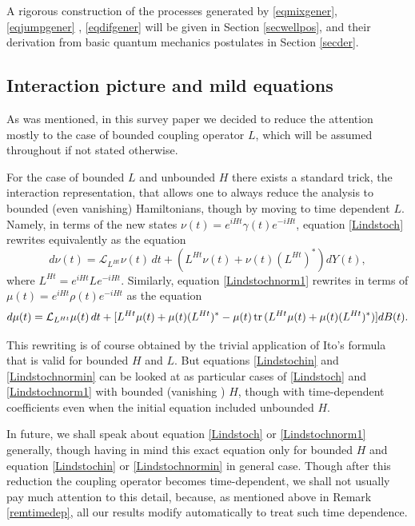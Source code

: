 \documentclass[12pt]{article}
\def\LC{\mathcal{L}}
\def\tr{\rm{tr}}
\def\ga{\gamma}
\begin{document}
A rigorous construction of the processes generated by
\eqref{eqmixgener}, \eqref{eqjumpgener} , \eqref{eqdifgener}
will be given in Section \ref{secwellpos},
 and their derivation from basic quantum mechanics postulates in Section \ref{secder}.

\subsection{Interaction picture and mild equations}
\label{secinter}

As was mentioned, in this survey paper we decided to reduce the attention mostly
 to the case of bounded coupling operator $L$,
which will be assumed throughout if not stated otherwise.

For the case of bounded $L$ and unbounded $H$ there exists a standard trick,
the interaction representation,
that allows one to always reduce the analysis to bounded (even vanishing) Hamiltonians, though by moving
to time dependent $L$.  Namely, in terms of the new states $\nu(t)=e^{iHt}\ga(t) e^{-iHt}$,
equation \eqref{Lindstoch} rewrites equivalently as the equation
\begin{equation}
\label{Lindstochin}
d\nu(t)=\LC_{L^{Ht}} \nu(t) \, dt +(L^{Ht}\nu(t)+\nu(t) (L^{Ht})^*) dY(t),
\end{equation}
where $L^{Ht}=e^{iHt} L e^{-iHt}$. Similarly, equation \eqref{Lindstochnorm1} rewrites in terms of
$\mu(t)=e^{iHt}\rho(t) e^{-iHt}$ as the equation
\begin{equation}
\label{Lindstochnormin}
d\mu(t)=\LC_{L^{Ht}} \mu (t)\, dt
+[L^{Ht}\mu(t)+\mu(t) (L^{Ht})^*-\mu(t)\, {\tr} \, (L^{Ht}\mu(t)+\mu(t) (L^{Ht})^*) ] dB(t).
\end{equation}

 This rewriting is of course obtained by the trivial application
of Ito's formula that is valid for bounded $H$ and $L$. But
equations  \eqref{Lindstochin} and \eqref{Lindstochnormin} can be looked at as particular cases
of  \eqref{Lindstoch} and \eqref{Lindstochnorm1} with bounded (vanishing ) $H$,
though with time-dependent coefficients even when the initial equation included unbounded $H$.

In future, we shall speak about equation \eqref{Lindstoch} or \eqref{Lindstochnorm1} generally,
though having in mind this exact equation only for bounded $H$ and equation \eqref{Lindstochin}
or \eqref{Lindstochnormin} in general case. Though after this reduction the coupling operator becomes
time-dependent, we shall not usually pay much attention to this detail, because, as mentioned
above in Remark \ref{remtimedep}, all our results modify automatically to treat such time dependence.
\end{document}
